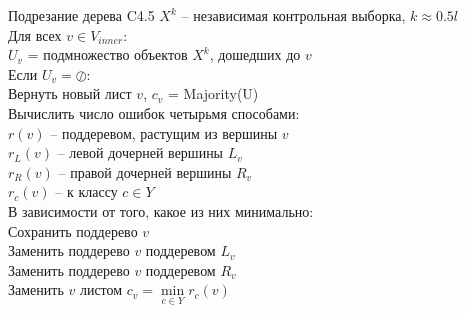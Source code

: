 \documentclass[10pt]{beamer}
\begin{document}
{
\begin{frame}{Подрезание дерева C4.5}
  $X^k$ -- независимая контрольная выборка, $k \approx 0.5l$\\
	Для всех $v \in V_{inner}$:\\
		\hspace{10mm} $U_v$ = подмножество объектов $X^k$, дошедших до $v$\\
		\hspace{10mm} Если $U_v = \oslash$:\\
		  \hspace{20mm} Вернуть новый лист $v$, $c_v$ = Majority(U)\\
		\hspace{10mm} Вычислить число ошибок четырьмя способами:\\
			\hspace{20mm} $r(v)$ -- поддеревом, растущим из вершины $v$\\
			\hspace{20mm} $r_L(v)$ -- левой дочерней вершины $L_v$\\
			\hspace{20mm} $r_R(v)$ -- правой дочерней вершины $R_v$\\
			\hspace{20mm} $r_c(v)$ -- к классу $c \in Y$\\
		\hspace{10mm} В зависимости от того, какое из них минимально:\\
			\hspace{20mm} Сохранить поддерево $v$\\
			\hspace{20mm} Заменить поддерево $v$ поддеревом $L_v$\\
			\hspace{20mm} Заменить поддерево $v$ поддеревом $R_v$\\
			\hspace{20mm} Заменить $v$ листом $c_v = \min\limits_{c \in Y} r_c(v)$\\
\end{frame}
}
\end{document}
